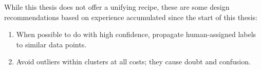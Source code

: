While this thesis does not offer a unifying recipe, these are some design recommendations based on experience accumulated since the start of this thesis:
\begin{enumerate}
\item When possible to do with high confidence, propagate human-assigned labels to similar data points.%
\item Avoid outliers within clusters at all costs; they cause doubt and confusion. 
\end{enumerate}





\begin{comment}
\section{Human Evaluator Consistency Issues}


Clustering python solutions has a strong subjective component. In early pilot studies, python programming teachers given the same set of solutions partitioned the space of solutions in a variety of ways, producing different numbers and/or compositions of clusters. \todo{add glassman at scale poster info and citation} Since teachers found multiple reasonable clusterings, the pilot results can be explained by one or both of the following reasons: (1) Teachers have different internal clustering metrics. (2) Given a clustering metric, solutions can still belong to multiple clusters.

It is also reasonable to assume that, given additional solutions to the same programming problem, some solutions would fall into existing clusters and some would represent wholly new solution successes or failures. It is reasonable to assume there is not some true total number of clusters that one reaches if one sees enough data.
\end{comment}



